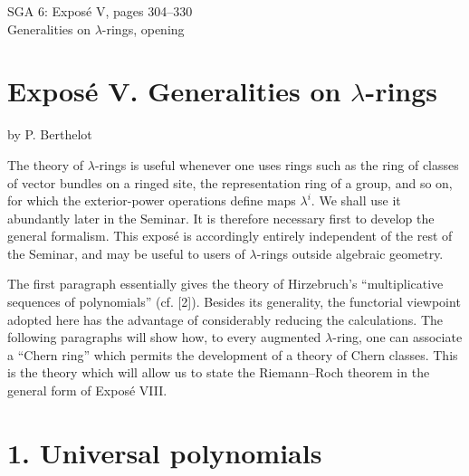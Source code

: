 \documentclass[11pt]{article}
\newcommand{\Fil}{\operatorname{Fil}}
\begin{document}
\providecommand{\Chat}{\widehat C}
\providecommand{\Ghat}{\widehat G}
\providecommand{\Gg}{\widehat G_g}
\providecommand{\Ga}{\widehat G_a}
\providecommand{\Grhat}{\widehat{\operatorname{Gr}}}
\providecommand{\Abfil}{\mathrm{Ab\,fil}}
\providecommand{\Kalgfil}{K\text{-}\mathrm{Alg.fil.}}
\providecommand{\Hom}{\operatorname{Hom}}
\providecommand{\Sym}{\mathfrak S}
\providecommand{\id}{\operatorname{Id}}
\providecommand{\Log}{\operatorname{Log}}
\providecommand{\Toddc}{\operatorname{Todd}}
\providecommand{\Ob}{\operatorname{Ob}}
\providecommand{\cG}{\mathcal G}
\providecommand{\cCzero}{\mathcal C_0}
\providecommand{\Fil}{\operatorname{Fil}}


\begin{center}
{\Large SGA 6: Exposé V, pages 304--330}\\[0.4em]
{\large Generalities on \(\lambda\)-rings, opening}
\end{center}


\section*{Exposé V. Generalities on \(\lambda\)-rings}
\begin{center}
by P. Berthelot
\end{center}

The theory of \(\lambda\)-rings is useful whenever one uses rings such as the ring of classes of vector bundles on a ringed site, the representation ring of a group, and so on, for which the exterior-power operations define maps \(\lambda^i\). We shall use it abundantly later in the Seminar. It is therefore necessary first to develop the general formalism. This exposé is accordingly entirely independent of the rest of the Seminar, and may be useful to users of \(\lambda\)-rings outside algebraic geometry.

The first paragraph essentially gives the theory of Hirzebruch's ``multiplicative sequences of polynomials'' (cf. [2]). Besides its generality, the functorial viewpoint adopted here has the advantage of considerably reducing the calculations. The following paragraphs will show how, to every augmented \(\lambda\)-ring, one can associate a ``Chern ring'' which permits the development of a theory of Chern classes. This is the theory which will allow us to state the Riemann--Roch theorem in the general form of Exposé VIII.

\section*{1. Universal polynomials}
\end{document}

